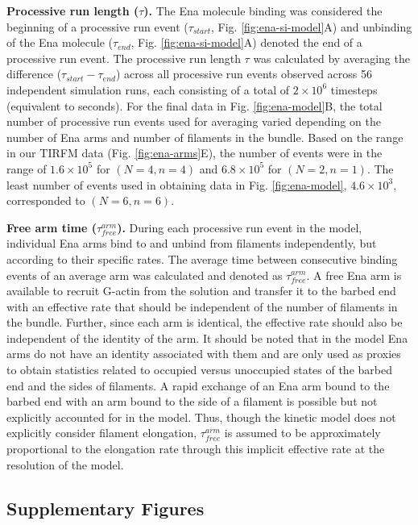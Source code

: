 \textbf{Processive run length ($\tau$).} The Ena molecule binding was considered the beginning of a processive run event ($\tau_{start}$, Fig. \ref{fig:ena-si-model}A) and unbinding of the Ena molecule ($\tau_{end}$, Fig. \ref{fig:ena-si-model}A) denoted the end of a processive run event. The processive run length $\tau$ was calculated by averaging the difference ($\tau_{start}-\tau_{end}$) across all processive run events observed across 56 independent simulation runs, each consisting of a total of $2\times 10^{6}$ timesteps (equivalent to  seconds).  
For the final data in Fig. \ref{fig:ena-model}B, the total number of processive run events used for averaging varied depending on the number of Ena arms and number of filaments in the bundle. Based on the range in our TIRFM data (Fig. \ref{fig:ena-arms}E), the number of events were in the range of \mytilde$1.6 \times 10^{5}$ for $(N=4, n=4)$ and $6.8 \times 10^{5}$ for $(N=2, n=1)$. The least number of events used in obtaining data in Fig. \ref{fig:ena-model}, \mytilde$4.6 \times 10^{3}$, corresponded to $(N=6, n=6)$.

\textbf{Free arm time ($\tau_{free}^{arm}$).} During each processive run event in the model, individual Ena arms bind to and unbind from filaments independently, but according to their specific rates. The average time between consecutive binding events of an average arm was calculated and denoted as $\tau_{free}^{arm}$. A free Ena arm is available to recruit G-actin from the solution and transfer it to the barbed end with an effective rate that should be independent of the number of filaments in the bundle. Further, since each arm is identical, the effective rate should also be independent of the identity of the arm. It should be noted that in the model Ena arms do not have an identity associated with them and are only used as proxies to obtain statistics related to occupied versus unoccupied states of the barbed end and the sides of filaments. A rapid exchange of an Ena arm bound to the barbed end with an arm bound to the side of a filament is possible but not explicitly accounted for in the model. Thus, though the kinetic model does not explicitly consider filament elongation, $\tau_{free}^{arm}$ is assumed to be approximately proportional to the elongation rate through this implicit effective rate at the resolution of the model.

\subsection{Supplementary Figures}\label{ch02-si-figures}
\clearpage

